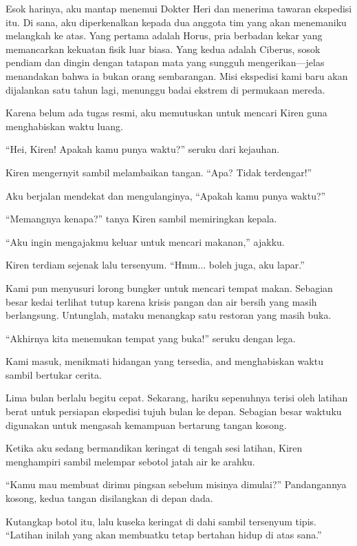 Esok harinya, aku mantap menemui Dokter Heri dan menerima tawaran ekspedisi itu. Di sana, aku diperkenalkan kepada dua anggota tim yang akan menemaniku melangkah ke atas. Yang pertama adalah Horus, pria berbadan kekar yang memancarkan kekuatan fisik luar biasa. Yang kedua adalah Ciberus, sosok pendiam dan dingin dengan tatapan mata yang sungguh mengerikan—jelas menandakan bahwa ia bukan orang sembarangan. Misi ekspedisi kami baru akan dijalankan satu tahun lagi, menunggu badai ekstrem di permukaan mereda.

Karena belum ada tugas resmi, aku memutuskan untuk mencari Kiren guna menghabiskan waktu luang.

``Hei, Kiren! Apakah kamu punya waktu?'' seruku dari kejauhan.

Kiren mengernyit sambil melambaikan tangan. ``Apa? Tidak terdengar!''

Aku berjalan mendekat dan mengulanginya, ``Apakah kamu punya waktu?''

``Memangnya kenapa?'' tanya Kiren sambil memiringkan kepala.

``Aku ingin mengajakmu keluar untuk mencari makanan,'' ajakku.

Kiren terdiam sejenak lalu tersenyum. ``Hmm$\dots$ boleh juga, aku lapar.''

Kami pun menyusuri lorong bungker untuk mencari tempat makan. Sebagian besar kedai terlihat tutup karena krisis pangan dan air bersih yang masih berlangsung. Untunglah, mataku menangkap satu restoran yang masih buka.

``Akhirnya kita menemukan tempat yang buka!'' seruku dengan lega.

Kami masuk, menikmati hidangan yang tersedia, and menghabiskan waktu sambil bertukar cerita.

Lima bulan berlalu begitu cepat. Sekarang, hariku sepenuhnya terisi oleh latihan berat untuk persiapan ekspedisi tujuh bulan ke depan. Sebagian besar waktuku digunakan untuk mengasah kemampuan bertarung tangan kosong.

Ketika aku sedang bermandikan keringat di tengah sesi latihan, Kiren menghampiri sambil melempar sebotol jatah air ke arahku.

``Kamu mau membuat dirimu pingsan sebelum misinya dimulai?'' Pandangannya kosong, kedua tangan disilangkan di depan dada.

Kutangkap botol itu, lalu kuseka keringat di dahi sambil tersenyum tipis. ``Latihan inilah yang akan membuatku tetap bertahan hidup di atas sana.''

